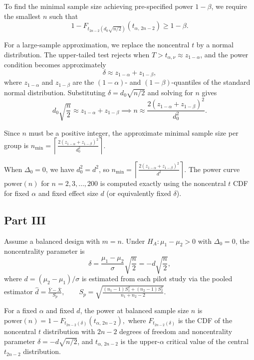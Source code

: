 \documentclass[letterpaper]{article}
\begin{document}
		To find the minimal sample size achieving pre-specified power $1-\beta$, we require the smallest $n$ such that
		$$1 - F_{t_{2n-2}(d_0\sqrt{n/2})}(t_{\alpha,\,2n-2}) \geq 1-\beta.$$
		
		For a large-sample approximation, we replace the noncentral $t$ by a normal distribution. The upper-tailed test rejects when $T > t_{\alpha,\nu} \approx z_{1-\alpha}$, and the power condition becomes approximately
		$$\delta \approx z_{1-\alpha} + z_{1-\beta},$$
		where $z_{1-\alpha}$ and $z_{1-\beta}$ are the $(1-\alpha)$- and $(1-\beta)$-quantiles of the standard normal distribution. Substituting $\delta = d_0\sqrt{n/2}$ and solving for $n$ gives
		$$d_0\sqrt{\frac{n}{2}} \approx z_{1-\alpha}+z_{1-\beta} \implies n \approx \frac{2(z_{1-\alpha}+z_{1-\beta})^2}{d_0^2}.$$
		
		Since $n$ must be a positive integer, the approximate minimal sample size per group is
		$n_{\min} = \left\lceil \frac{2(z_{1-\alpha}+z_{1-\beta})^2}{d_0^2} \right\rceil.$
		
		When $\Delta_0=0$, we have $d_0^2=d^2$, so
		$n_{\min} = \left\lceil \frac{2(z_{1-\alpha}+z_{1-\beta})^2}{d^2} \right\rceil.$ The power curve $\text{power}(n)$ for $n=2,3,\dots,200$ is computed exactly using the noncentral $t$ CDF for fixed $\alpha$ and fixed effect size $d$ (or equivalently fixed $\delta$).
		
		\clearpage
		
		\subsection{Part III}
		
		
		Assume a balanced design with $m=n$. Under $H_A:\mu_1-\mu_2>0$ with $\Delta_0=0$, the noncentrality parameter is
		$$\delta = \frac{\mu_1-\mu_2}{\sigma}\sqrt{\frac{n}{2}} = -d\sqrt{\frac{n}{2}},$$
		where $d=(\mu_2-\mu_1)/\sigma$ is estimated from each pilot study via the pooled estimator
		$\hat d = \frac{\bar Y - \bar X}{S_p}, \qquad S_p = \sqrt{\frac{(n_1-1)S_1^2+(n_2-1)S_2^2}{n_1+n_2-2}}.$
		
		For a fixed $\alpha$ and fixed $d$, the power at balanced sample size $n$ is
		$\text{power}(n) = 1 - F_{t_{2n-2}(\delta)}(t_{\alpha,\,2n-2}),$
		where $F_{t_{2n-2}(\delta)}$ is the CDF of the noncentral $t$ distribution with $2n-2$ degrees of freedom and noncentrality parameter $\delta = -d\sqrt{n/2}$, and $t_{\alpha,\,2n-2}$ is the upper-$\alpha$ critical value of the central $t_{2n-2}$ distribution.
		
\end{document}
